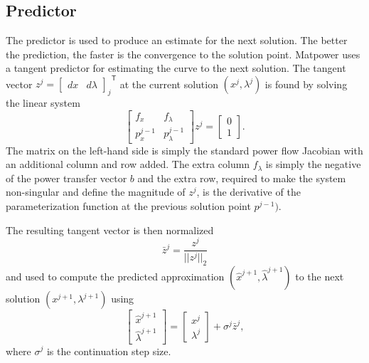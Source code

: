 \documentclass[12pt]{article}
\newcommand{\matpower}[0]{{\sc Matpower}}
\newcommand{\trans}[1]{{#1}^{\ensuremath{\mathsf{T}}}}  %
\numberwithin{equation}{section}
\numberwithin{table}{section}
\numberwithin{figure}{section}
\begin{document}
\subsection{Predictor}
The predictor is used to produce an estimate for the next solution. The better the prediction, the faster is the convergence to the solution point. \matpower{} uses a tangent predictor for estimating the curve to the next solution. The tangent vector $z^j = \trans{\left[ \begin{array}{cc}dx & d\lambda \end{array} \right]_j}$ at the current solution $(x^j,\lambda^j)$ is found by solving the linear system
\begin{equation}
\left[ \begin{array}{cc}
  f_x & f_\lambda \\
  p^{j-1}_x & p^{j-1}_\lambda
\end{array} \right] z^j =
\left[ \begin{array}{c}
  0 \\
  1  \end{array} \right].
\label{eq:tangent_predictor}
\end{equation}
The matrix on the left-hand side is simply the standard power flow Jacobian with an additional column and row added. The extra column $f_\lambda$ is simply the negative of the power transfer vector $b$ and the extra row, required to make the system non-singular and define the magnitude of $z^j$, is the derivative of the parameterization function at the previous solution point $p^{j-1})$.

The resulting tangent vector is then normalized
\begin{equation}
\bar{z}^j = \frac{z^j}{|| z^j ||_2}
\end{equation}
and used to compute the predicted approximation $(\hat{x}^{j+1},\hat{\lambda}^{j+1})$ to the next solution $\left({x}^{j+1},{\lambda}^{j+1}\right)$ using
\begin{equation}
\left[\begin{array}{c}\hat{x}^{j+1} \\ \hat{\lambda}^{j+1}\end{array}\right] = 
\left[\begin{array}{c}x^j \\ \lambda^j \end{array}\right] + \sigma^j \bar{z}^j,
\end{equation}
where $\sigma^j$ is the continuation step size.
\end{document}
